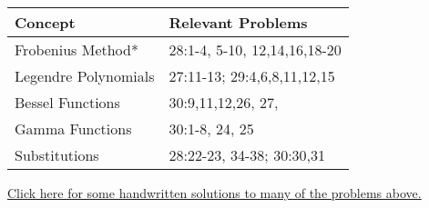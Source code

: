\begin{center}
\begin{tabular}{|l|l|}
\hline
Concept	&Relevant Problems\\\hline
Frobenius Method*&28:1-4, 5-10, 12,14,16,18-20\\ \hline
Legendre Polynomials&27:11-13; 29:4,6,8,11,12,15 \\ \hline
Bessel Functions&30:9,11,12,26, 27,\\ \hline
Gamma Functions& 30:1-8, 24, 25\\ \hline
Substitutions&28:22-23, 34-38; 30:30,31 \\ \hline
\end{tabular}
\end{center}

\href{https://content.byui.edu/file/664390b8-e9cc-43a4-9f3c-70362f8b9735/1/09-Special-Functions-Preparation-Solutions.pdf}{Click here for some handwritten solutions to many of the problems above. }

\restoregeometry



